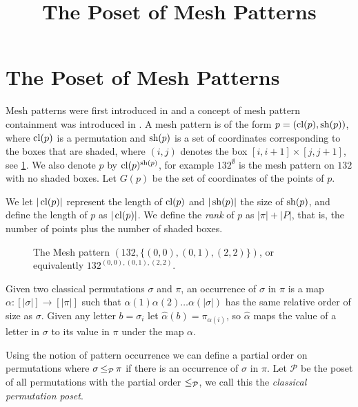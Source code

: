 \documentclass[11pt,a4paper,oneside]{article}
\title{The Poset of Mesh Patterns}
\begin{document}
	\maketitle


\section{The Poset of Mesh Patterns}

Mesh patterns were first introduced in \cite{Bra11} and a concept of mesh
pattern containment was introduced in \cite{TU17}. A mesh pattern is of the form
$p=(\operatorname{\textrm{cl}}(p),\operatorname{\textrm{sh}}(p))$, where $\operatorname{\textrm{cl}}(p)$ is a permutation and $\operatorname{\textrm{sh}}(p)$ is a set of
coordinates corresponding to the boxes that are shaded, where $(i,j)$ denotes
the box $[i,i+1]\times[j,j+1]$, see \cref{fig:132}. We also denote $p$ by
$\operatorname{\textrm{cl}}(p)^{\operatorname{\textrm{sh}}(p)}$, for example $132^\emptyset$ is the mesh pattern on $132$ with
no shaded boxes. Let $G(p)$ be the set of coordinates of the points of $p$.

We let $|\operatorname{\textrm{cl}}(p)|$ represent the length of $\operatorname{\textrm{cl}}(p)$ and $|\operatorname{\textrm{sh}}(p)|$ the size of
$\operatorname{\textrm{sh}}(p)$, and define the length of $p$ as $|\operatorname{\textrm{cl}}(p)|$. We define the \emph{rank}
of $p$ as $|\pi|+|P|$, that is, the number of points plus the number of shaded
boxes.


\begin{figure}\centering{}
\caption{The Mesh pattern $(132,\{(0,0),(0,1),(2,2)\})$, or equivalently $132^{(0,0),(0,1),(2,2)}$.}\label{fig:132}\end{figure}

Given two classical permutations $\sigma$ and $\pi$, an occurrence of $\sigma$
in $\pi$ is a map $\alpha:[|\sigma|]\rightarrow[|\pi|]$ such that
$\alpha(1)\alpha(2)\ldots\alpha(|\sigma|)$ has the same relative order of size
as $\sigma$. Given any letter $b=\sigma_i$ let
$\hat{\alpha}(b)=\pi_{\alpha(i)}$, so $\hat{\alpha}$ maps the value of a letter
in $\sigma$ to its value in $\pi$ under the map $\alpha$.

Using the notion of pattern occurrence we can define a partial order on
permutations where $\sigma\operatorname{\le_{\mathcal{P}}}\pi$ if there is an occurrence of $\sigma$ in
$\pi$. Let $\mathcal{P}$ be the poset of all permutations with the partial order
$\operatorname{\le_{\mathcal{P}}}$, we call this the \emph{classical permutation poset}.
\end{document}
